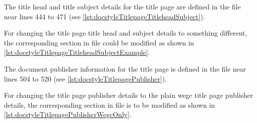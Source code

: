 
The title head and title subject details for the title page are defined in
the file  near lines 444 to 471 (see
\autoref{lst:docstyleTitlepageTitleheadSubject}).



For changing the title page title head and subject details to something
different, the corresponding section in file  could
be modified as shown in
\autoref{lst:docstyleTitlepageTitleheadSubjectExample}.
%
\begin{CommandLineListing}[style=DefaultFileListing, print=true, xleftmargin=0pt, gobble=2, %
  caption={Alternate definition of title page title head and subject details in \latexcmd{docstyle.sty}}, %
  label=lst:docstyleTitlepageTitleheadSubjectExample]
  \newcommand*{\titleheadSubstr}{%
    \aces{wegc}%
  }
  \newcommand*{\titleheadSubSubstr}{%
    \aces{esa}%
  }
  \titlehead{%
    \makebox[\linewidth]{\titleheadSubstr \hbox{} \acel{\ThisDocType} for \titleheadSubSubstr \hbox{} \No{} \ThisDocExtNum\textfractionsolidus\ThisDocYear}%
  }
  \newcommand*{\subjectStr}{%
    rOPS Project\p:\\%
  }
  \newcommand*{\subjectSubstr}{%
    Typesetting and Document Generation%
  }
  \subject{%
    \subjectStr\subjectSubstr%
  }
\end{CommandLineListing}



The document publisher information for the title page is defined in the
file  near lines 504 to 520 (see
\autoref{lst:docstyleTitlepagePublisher}).



For changing the title page publisher details to the plain \ac{wegc}
title page publisher details, the corresponding section in file
 is to be modified as shown in
\autoref{lst:docstyleTitlepagePublisherWegcOnly}.
%
\begin{CommandLineListing}[style=DefaultFileListing, print=true, xleftmargin=0pt, gobble=2, %
  caption={Alternate definition of title publisher details in \latexcmd{docstyle.sty}}, %
  label=lst:docstyleTitlepagePublisherWegcOnly]
  \newcommand*{\publishersSubstr}{%
    \acl{wegc}%
  }
  \newcommand*{\publishersSubSubstr}{%
    \acl{ug}%
  }
  \newcommand*{\publishersSubSubSubstr}{%
  }
  \publishers{%
    \publishersSubstr\\\publishersSubSubstr\\\publishersSubSubSubstr%
  }
\end{CommandLineListing}


